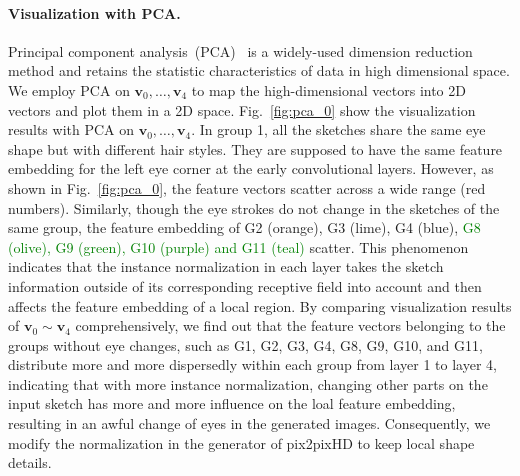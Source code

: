 \documentclass[10pt,twocolumn,letterpaper]{article}
\newcommand{\cxj}[1]{\textcolor{red}{(Cxj: #1)}}
\newcommand{\amend}[1]{\textcolor{green}{#1}}
\begin{document}

 
\paragraph{Visualization with PCA.} Principal component analysis~(PCA)~\cite{pca} is a widely-used dimension reduction method and retains the statistic characteristics of data in high dimensional space. 
We employ PCA on $\boldsymbol{v}_0,\ldots, \boldsymbol{v}_4$ to map the high-dimensional vectors into 2D vectors and plot them in a 2D space. 
Fig.~\ref{fig:pca_0} show the visualization results with PCA on $\boldsymbol{v}_0,\ldots,\boldsymbol{v}_4$. 
%
In group 1, all the sketches share the same eye shape but with different hair styles. They are supposed to have the same feature embedding for the left eye corner at the early convolutional layers. However, as shown in Fig.~\ref{fig:pca_0}, the feature vectors scatter across a wide range (red numbers). 
Similarly, though the eye strokes do not change in the sketches of the same group, the feature embedding of G2 (orange), G3 (lime), G4 (blue), \amend{G8 (olive), G9 (green), G10 (purple) and G11 (teal)} scatter.
%
This phenomenon indicates that the instance normalization in each layer takes the sketch information outside of its corresponding receptive field into account and then affects the feature embedding of a local region. 
By comparing visualization results of $\boldsymbol{v}_0\sim\boldsymbol{v}_4$ comprehensively, we find out that the feature vectors belonging to the groups without eye changes, such as G1, G2, G3, G4, G8, G9, G10, and G11, distribute more and more dispersedly within each group from layer 1 to layer 4, indicating that with more instance normalization, changing other parts on the input sketch has more and more influence on the loal feature embedding, resulting in an awful change of eyes in the generated images.
Consequently, we modify the normalization in the generator of pix2pixHD to keep local shape details. 
\end{document}

